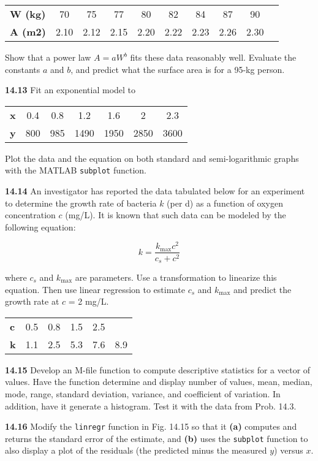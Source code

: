 \documentclass[../main.tex]{subfiles}
\begin{document}
\begin{multicols}{2}
	\noindent \begin{tabular}{l c c c c c c c c c}
		\textbf{W (kg)} & 70 & 75 & 77 & 80 & 82 & 84 & 87 & 90 \\
		\textbf{A (m2)} & 2.10 & 2.12 & 2.15 & 2.20 & 2.22 & 2.23 & 2.26 & 2.30 &
  	\end{tabular}

	\noindent Show that a power law $A = aW^b$ fits these data reasonably
	well. Evaluate the constants $a$ and $b$, and predict what the
	surface area is for a 95-kg person.

	\noindent\textbf{14.13} Fit an exponential model to

	\noindent \begin{tabular}{l c c c c c c }
		\textbf{x} & 0.4 & 0.8 & 1.2 & 1.6 & 2 & 2.3 \\
		\textbf{y} & 800 & 985 & 1490 & 1950 & 2850 & 3600
  	\end{tabular}

	\noindent Plot the data and the equation on both standard and semi-logarithmic graphs with the MATLAB \texttt{subplot} function.

	\noindent\textbf{14.14} An investigator has reported the data tabulated below
	for an experiment to determine the growth rate of bacteria
	$k$ (per d) as a function of oxygen concentration $c$ (mg/L). It
	is known that such data can be modeled by the following
	equation:

	$$k = \frac{k_{\text{max}} c^2}{c_s + c^2}$$

	\noindent where $c_s$ and $k_{\text{max}}$ are parameters. Use a transformation to
	linearize this equation. Then use linear regression to estimate $c_s$ and $k_{\text{max}}$ and predict the growth rate at $c$ = 2 mg/L.

	\noindent \begin{tabular}{l c c c c c}
		\textbf{c} & 0.5 & 0.8 & 1.5 & 2.5 \\
		\textbf{k} & 1.1 & 2.5 & 5.3 & 7.6 & 8.9
  	\end{tabular}

	\noindent\textbf{14.15} Develop an M-file function to compute descriptive
	statistics for a vector of values. Have the function determine
	and display number of values, mean, median, mode, range,
	standard deviation, variance, and coefficient of variation. In
	addition, have it generate a histogram. Test it with the data
	from Prob. 14.3.

	\noindent\textbf{14.16}  Modify the \texttt{linregr} function in Fig. 14.15 so that it
	\textbf{(a)} computes and returns the standard error of the estimate,
	and \textbf{(b)} uses the \texttt{subplot} function to also display a plot of
	the residuals (the predicted minus the measured $y$) versus $x$.


\end{multicols}
\end{document}
